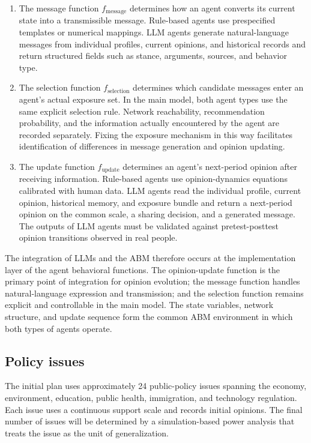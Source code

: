 \documentclass[11pt,a4paper]{article}
\begin{document}
\begin{enumerate}
\item The message function $f_{\text{message}}$ determines how an agent converts its current state into a transmissible message. Rule-based agents use prespecified templates or numerical mappings. LLM agents generate natural-language messages from individual profiles, current opinions, and historical records and return structured fields such as stance, arguments, sources, and behavior type.
\item The selection function $f_{\text{selection}}$ determines which candidate messages enter an agent's actual exposure set. In the main model, both agent types use the same explicit selection rule. Network reachability, recommendation probability, and the information actually encountered by the agent are recorded separately. Fixing the exposure mechanism in this way facilitates identification of differences in message generation and opinion updating.
\item The update function $f_{\text{update}}$ determines an agent's next-period opinion after receiving information. Rule-based agents use opinion-dynamics equations calibrated with human data. LLM agents read the individual profile, current opinion, historical memory, and exposure bundle and return a next-period opinion on the common scale, a sharing decision, and a generated message. The outputs of LLM agents must be validated against pretest-posttest opinion transitions observed in real people.
\end{enumerate}

The integration of LLMs and the ABM therefore occurs at the implementation layer of the agent behavioral functions. The opinion-update function is the primary point of integration for opinion evolution; the message function handles natural-language expression and transmission; and the selection function remains explicit and controllable in the main model. The state variables, network structure, and update sequence form the common ABM environment in which both types of agents operate.

\subsection{Policy issues}

The initial plan uses approximately 24 public-policy issues spanning the economy, environment, education, public health, immigration, and technology regulation. Each issue uses a continuous support scale and records initial opinions. The final number of issues will be determined by a simulation-based power analysis that treats the issue as the unit of generalization.
\end{document}
